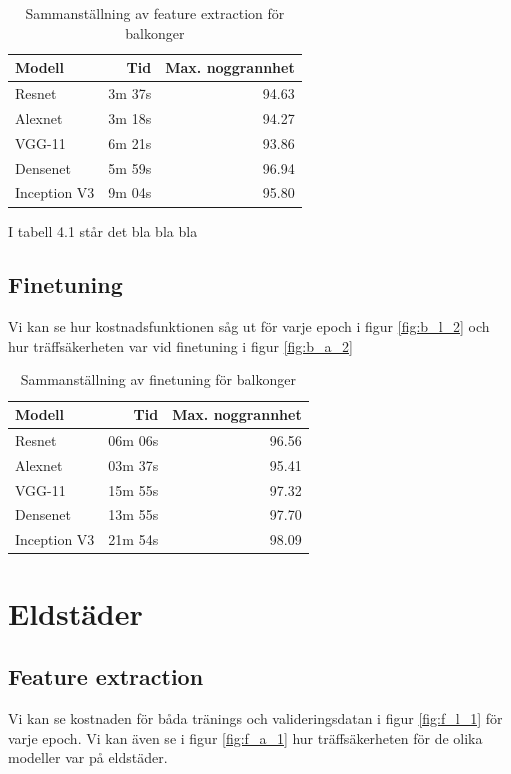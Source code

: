 \documentclass[]{kththesis}
\begin{document}
\begin{table}[!htbp]
  \centering
  \begin{tabular}{|l|r|r|}
    Modell & Tid & Max. noggrannhet \\ 
    \hline
    Resnet       & 3m 37s & 94.63 \\
    Alexnet      & 3m 18s & 94.27 \\
    VGG-11       & 6m 21s & 93.86 \\
    Densenet     & 5m 59s & 96.94 \\
    Inception V3 & 9m 04s & 95.80 \\
  \end{tabular}
  \caption{Sammanställning av feature extraction för balkonger}
\end{table}

I tabell 4.1 står det bla bla bla

\subsection{Finetuning}
Vi kan se hur kostnadsfunktionen såg ut för varje epoch i figur \ref{fig:b_l_2} och hur träffsäkerheten var vid finetuning i figur \ref{fig:b_a_2}

\begin{table}[!htbp]
  \centering
  \begin{tabular}{|l|r|r|}
    Modell & Tid & Max. noggrannhet \\ 
    \hline
    Resnet       & 06m 06s & 96.56 \\
    Alexnet      & 03m 37s & 95.41 \\
    VGG-11       & 15m 55s & 97.32 \\
    Densenet     & 13m 55s & 97.70 \\
    Inception V3 & 21m 54s & 98.09 \\
  \end{tabular}
  \caption{Sammanställning av finetuning för balkonger}
\end{table}



\section{Eldstäder}

\subsection{Feature extraction}
Vi kan se kostnaden för båda tränings och valideringsdatan i figur \ref{fig:f_l_1} för varje epoch. Vi kan även se i figur \ref{fig:f_a_1} hur träffsäkerheten för de olika modeller var på eldstäder.
\end{document}
